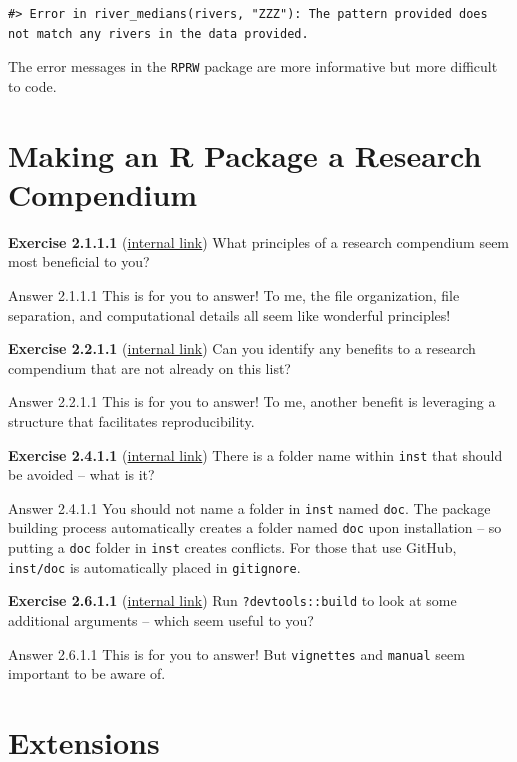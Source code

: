 \documentclass[
]{book}
\begin{document}
\begin{verbatim}
#> Error in river_medians(rivers, "ZZZ"): The pattern provided does not match any rivers in the data provided.
\end{verbatim}

The error messages in the \texttt{RPRW} package are more informative but more difficult to code.

\hypertarget{making-an-r-package-a-research-compendium}{%
\section*{Making an R Package a Research Compendium}\label{making-an-r-package-a-research-compendium}}

\textbf{Exercise 2.1.1.1} (\protect\hyperlink{ex-set7}{internal link})
What principles of a research compendium seem most beneficial to you?

Answer 2.1.1.1
This is for you to answer! To me, the file organization, file separation, and computational details all seem like wonderful principles!

\textbf{Exercise 2.2.1.1} (\protect\hyperlink{ex-set8}{internal link})
Can you identify any benefits to a research compendium that are not already on this list?

Answer 2.2.1.1
This is for you to answer! To me, another benefit is leveraging a structure that facilitates reproducibility.

\textbf{Exercise 2.4.1.1} (\protect\hyperlink{ex-set9}{internal link})
There is a folder name within \texttt{inst} that should be avoided -- what is it?

Answer 2.4.1.1
You should not name a folder in \texttt{inst} named \texttt{doc}. The package building process automatically creates a folder named \texttt{doc} upon installation -- so putting a \texttt{doc} folder in \texttt{inst} creates conflicts. For those that use GitHub, \texttt{inst/doc} is automatically placed in \texttt{gitignore}.

\textbf{Exercise 2.6.1.1} (\protect\hyperlink{ex-set10}{internal link})
Run \texttt{?devtools::build} to look at some additional arguments -- which seem useful to you?

Answer 2.6.1.1
This is for you to answer! But \texttt{vignettes} and \texttt{manual} seem important to be aware of.

\hypertarget{extensions-1}{%
\section*{Extensions}\label{extensions-1}}
\end{document}

